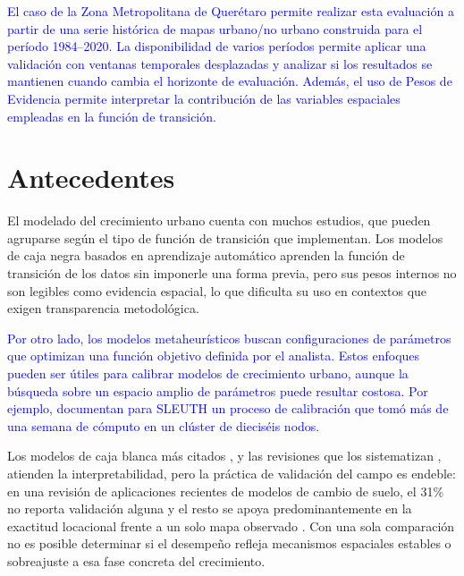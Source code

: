 \textcolor{blue}{El caso de la Zona Metropolitana de Querétaro permite realizar esta evaluación a partir de una serie histórica de mapas urbano/no urbano construida para el período 1984--2020. La disponibilidad de varios períodos permite aplicar una validación con ventanas temporales desplazadas y analizar si los resultados se mantienen cuando cambia el horizonte de evaluación. Además, el uso de Pesos de Evidencia permite interpretar la contribución de las variables espaciales empleadas en la función de transición.}


\section{Antecedentes}

El modelado del crecimiento urbano cuenta con muchos estudios, que pueden agruparse según el tipo de función de transición que implementan. Los modelos de caja negra basados en aprendizaje automático \parencite{almeida2008stochastic,Gomez2020} aprenden la función de transición de los datos sin imponerle una forma previa, pero sus pesos internos no son legibles como evidencia espacial, lo que dificulta su uso en contextos que exigen transparencia metodológica.

\textcolor{blue}{Por otro lado, los modelos metaheurísticos \parencite{Wang2021} buscan configuraciones de parámetros que optimizan una función objetivo definida por el analista. Estos enfoques pueden ser útiles para calibrar modelos de crecimiento urbano, aunque la búsqueda sobre un espacio amplio de parámetros puede resultar costosa. Por ejemplo, \textcite{Jantz2003} documentan para SLEUTH un proceso de calibración que tomó más de una semana de cómputo en un clúster de dieciséis nodos.}

Los modelos de caja blanca más citados \parencite{Clarke1998}, y las revisiones que los sistematizan \parencite{Sante2010,Aburas2016}, atienden la interpretabilidad, pero la práctica de validación del campo es endeble: en una revisión de aplicaciones recientes de modelos de cambio de suelo, el 31\% no reporta validación alguna y el resto se apoya predominantemente en la exactitud locacional frente a un solo mapa observado \parencite{vanVliet2016}. Con una sola comparación no es posible determinar si el desempeño refleja mecanismos espaciales estables o sobreajuste a esa fase concreta del crecimiento.

